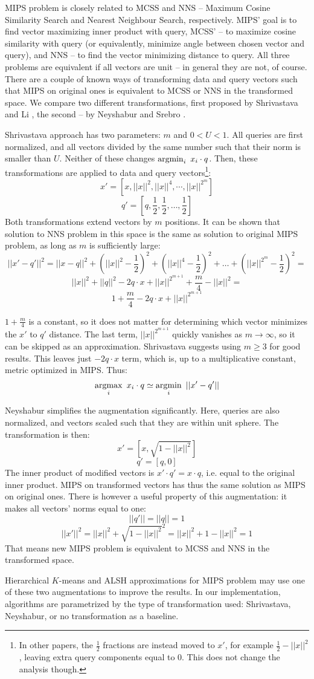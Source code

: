 MIPS problem is closely related to MCSS and NNS -- Maximum Cosine
Similarity Search and Nearest Neighbour Search, respectively.
MIPS' goal is to find vector maximizing inner product with query,
MCSS' -- to maximize cosine similarity with query (or equivalently,
minimize angle between chosen vector and query), and NNS -- to find
the vector minimizing distance to query. All three problems are
equivalent if all vectors are unit -- in general they are not, of course.
There are a couple of known ways
of transforming data and query vectors such that MIPS on original ones
is equivalent to MCSS or NNS in the transformed space. We compare two different
transformations, first proposed by Shrivastava and Li \cite{alsh}, the second -- by
Neyshabur and Srebro \cite{neyshabur}.

Shrivastava approach has two parameters: $m$ and $0 < U < 1$. All queries
are first normalized, and all vectors divided by the same number such that
their norm is smaller than $U$. Neither of these changes
$ \operatorname*{argmin}_{i}\ x_i \cdot q$. Then, these transformations are applied to data
and query vectors\footnote{In other papers, the $\frac{1}{2}$ fractions are
instead moved to $x'$, for example $\frac{1}{2} - ||x||^2$, leaving extra
query components equal to 0. This does not change the analysis though.}:
$$
x' = [x, ||x||^2, ||x||^4, \cdots, ||x||^{2^m}]
$$
$$
q' = [q, \frac{1}{2}, \frac{1}{2}, \dots, \frac{1}{2}]
$$
Both transformations extend vectors by $m$ positions. It can be shown that
solution to NNS problem in this space is the same as solution to original
MIPS problem, as long as $m$ is sufficiently large:
$$
||x' - q'||^2 = ||x - q||^2 +
(||x||^2 - \frac{1}{2})^2 + (||x||^4 - \frac{1}{2})^2 + \dots + 
(||x||^{2^m} - \frac{1}{2})^2 =
$$
$$
||x||^2 + ||q||^2 - 2 q \cdot x
+ ||x||^{2^{m+1}} + \frac{m}{4} - ||x||^2 =
$$
$$
1 + \frac{m}{4} - 2 q \cdot x + ||x||^{2^{m+1}}
$$

$ 1 + \frac{m}{4} $ is a constant, so it does not matter for determining 
which vector minimizes the $x'$ to $q'$ distance. The last term, 
$||x||^{2^{m+1}}$ quickly vanishes as $m \to \infty$, so it can be skipped
as an approximation. Shrivastava suggests using $m \ge 3$ for good results.
This leaves just $ - 2 q \cdot x $ term, which is, up to a multiplicative
constant, metric optimized in MIPS.
Thus:
$$
\operatorname*{argmax}_{i}\ x_i \cdot q \simeq \operatorname*{argmin}_{i}\ ||x' - q'||
$$

Neyshabur simplifies the augmentation significantly. Here, queries are also
normalized, and vectors scaled such that they are within unit sphere. The
transformation is then:
$$
x' = [x, \sqrt{1 - ||x||^2}]
$$
$$
q' = [q, 0]
$$
The inner product of modified vectors is $x' \cdot q' = x \cdot q$, i.e. equal
to the original inner product. MIPS on transformed vectors has thus the same
solution as MIPS on original ones. There is however a useful property of this
augmentation: it makes all vectors' norms equal to one: 
$$ ||q'|| = ||q|| = 1 $$
$$ ||x'||^2 = ||x||^2 + \sqrt{1 - ||x||^2}^2 = ||x||^2 + 1 - ||x||^2 = 1 $$
That means new MIPS problem is equivalent to MCSS and NNS in the transformed
space.

Hierarchical $K$-means and ALSH approximations for MIPS problem may use one
of these two augmentations to improve the results. In our implementation,
algorithms are parametrized by the type of transformation used: Shrivastava,
Neyshabur, or no transformation as a baseline.
